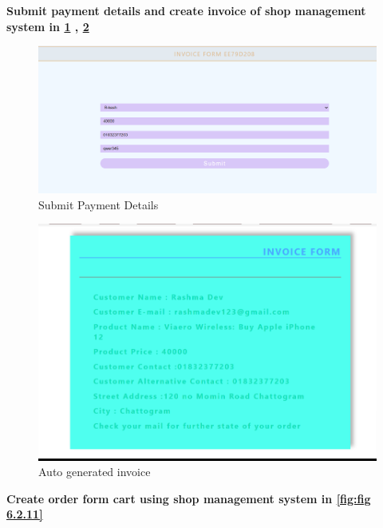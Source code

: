 \newpage
\textbf{Submit payment details and create invoice of shop management system in \ref{fig:fig 6.2.8} , \ref{fig:fig 6.2.9}}\\[2cm]
 \begin{figure}[ht]
  \centering  
\includegraphics[width=\textwidth,height=0.2\textheight]{designs/submit payment details.png}    
    \caption{Submit Payment Details}
    \label{fig:fig 6.2.8}
 \end{figure}
\begin{figure}[ht]
     \centering  
     \includegraphics[width=\textwidth]{designs/got invoice.png}    
     \caption{Auto generated invoice}
     \label{fig:fig 6.2.9}
 \end{figure}




\newpage

\textbf{Create order form cart using shop 
management system in \ref{fig:fig 6.2.11}}\\[2cm]
 
